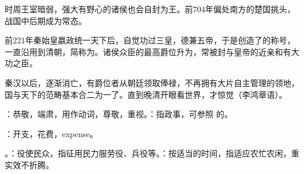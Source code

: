 {{\begin{lyenumerate}
时周王室暗弱，强大有野心的诸侯也会自封为王。前704年偏处南方的楚国挑头，战国中后期成为常态。

\item {}前221年秦始皇嬴政统一天下后，自觉功过三皇，德兼五帝，于是创造了的称号，一直沿用到清朝，简称为。诸侯众臣的最高爵位升为，常被封与皇帝的近亲和有大功之臣。

秦汉以后，逐渐消亡，有爵位者从朝廷领取俸禄，不再拥有大片自主管理的领地，国与天下的范畴基本合二为一了。直到晚清开眼看世界，才惊觉（李鸿章语）。
\end{lyenumerate}
}

\item {}：恭敬，端肃，用作动词，尊敬，重视。：指政事，可参照  的。

\item {}：开支，花费，expense。

\item {}。：役使民众，指征用民力服劳役、兵役等。：按适当的时间，指适应农忙农闲，重实效不折腾。
}
{}


